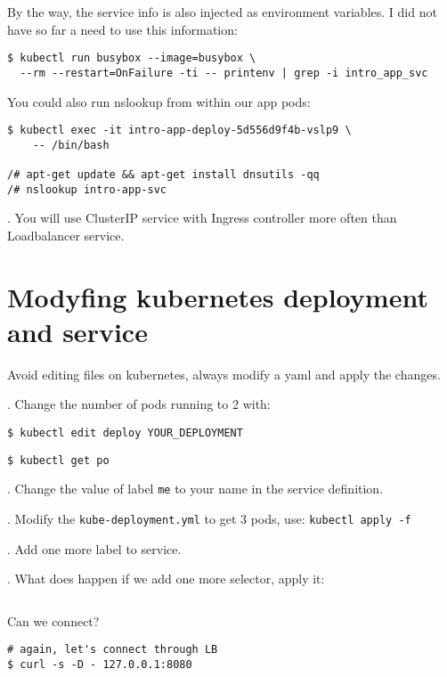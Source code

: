 \documentclass[12pt, letterpaper]{article}
\begin{document}
By the way, the service info is also injected as environment variables. I did not have so far a need to use this information:%
\begin{verbatim}
$ kubectl run busybox --image=busybox \
  --rm --restart=OnFailure -ti -- printenv | grep -i intro_app_svc
\end{verbatim}%

You could also run nslookup from within our app pods:%
\begin{verbatim}
$ kubectl exec -it intro-app-deploy-5d556d9f4b-vslp9 \
    -- /bin/bash

/# apt-get update && apt-get install dnsutils -qq
/# nslookup intro-app-svc
\end{verbatim}%

. You will use ClusterIP service with Ingress controller more often than Loadbalancer service.

%
\section{Modyfing kubernetes deployment and service}

Avoid editing files on kubernetes, always modify a yaml and apply the changes.

. Change the number of pods running to 2 with:

\begin{verbatim}
$ kubectl edit deploy YOUR_DEPLOYMENT
\end{verbatim}

\begin{verbatim}
$ kubectl get po
\end{verbatim}

. Change the value of label \verb|me| to your name in the service definition.

. Modify the \verb|kube-deployment.yml| to get 3 pods, use: \texttt{kubectl apply -f}

. Add one more label to service.

. What does happen if we add one more selector, apply it:

\inputminted{yaml}{manifests/exercise-broke-svc/kube-service-broke.yml}

Can we connect?

\begin{verbatim}
# again, let's connect through LB
$ curl -s -D - 127.0.0.1:8080

\end{verbatim}
\end{document}
